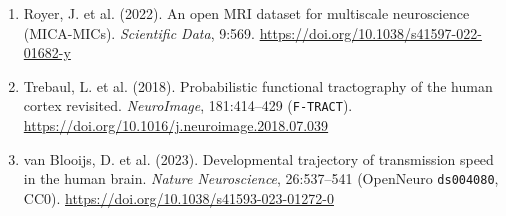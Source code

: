 \documentclass[11pt,a4paper]{article}
\begin{document}
\begin{enumerate}
\item Royer, J. et al. (2022). An open MRI dataset for multiscale neuroscience (MICA-MICs). \emph{Scientific Data}, 9:569. \url{https://doi.org/10.1038/s41597-022-01682-y}
\item Trebaul, L. et al. (2018). Probabilistic functional tractography of the human cortex revisited. \emph{NeuroImage}, 181:414--429 (\texttt{F-TRACT}). \url{https://doi.org/10.1016/j.neuroimage.2018.07.039}
\item van Blooijs, D. et al. (2023). Developmental trajectory of transmission speed in the human brain. \emph{Nature Neuroscience}, 26:537--541 (OpenNeuro \texttt{ds004080}, CC0). \url{https://doi.org/10.1038/s41593-023-01272-0}
\end{enumerate}
\end{document}
